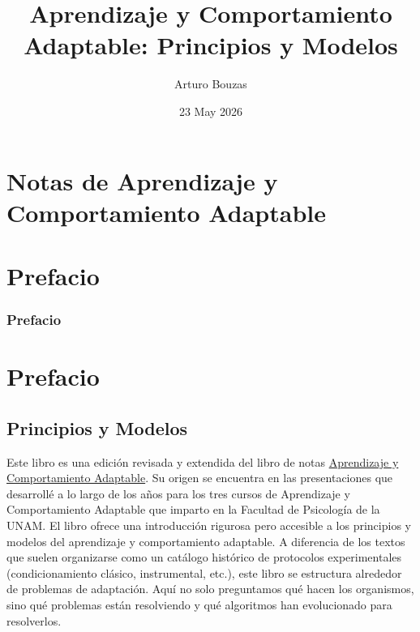 \documentclass[
  letterpaper,
  DIV=11,
  numbers=noendperiod]{scrreprt}
\title{Aprendizaje y Comportamiento Adaptable: Principios y Modelos}
\author{Arturo Bouzas}
\date{23 May 2026}
\renewcommand*\contentsname{Table of contents}
\newcommand\contentsname{Table of contents}
\begin{document}
\maketitle

\renewcommand*\contentsname{En esta página}
{
\hypersetup{linkcolor=}
\setcounter{tocdepth}{2}
\tableofcontents
}


\chapter{Notas de Aprendizaje y Comportamiento
Adaptable}\label{notas-de-aprendizaje-y-comportamiento-adaptable}


\chapter*{Prefacio}\label{prefacio}


\subsection{Prefacio}\label{prefacio-1}


\chapter{Prefacio}\label{prefacio-2}

\section{Principios y Modelos}\label{principios-y-modelos}

Este libro es una edición revisada y extendida del libro de notas
\href{https://arbouria.github.io/Notas-Aprendizaje-y-Comportamiento-Adaptable-I/}{Aprendizaje
y Comportamiento Adaptable}. Su origen se encuentra en las
presentaciones que desarrollé a lo largo de los años para los tres
cursos de Aprendizaje y Comportamiento Adaptable que imparto en la
Facultad de Psicología de la UNAM. El libro ofrece una introducción
rigurosa pero accesible a los principios y modelos del aprendizaje y
comportamiento adaptable. A diferencia de los textos que suelen
organizarse como un catálogo histórico de protocolos experimentales
(condicionamiento clásico, instrumental, etc.), este libro se estructura
alrededor de problemas de adaptación. Aquí no solo preguntamos qué hacen
los organismos, sino qué problemas están resolviendo y qué algoritmos
han evolucionado para resolverlos.
\end{document}
